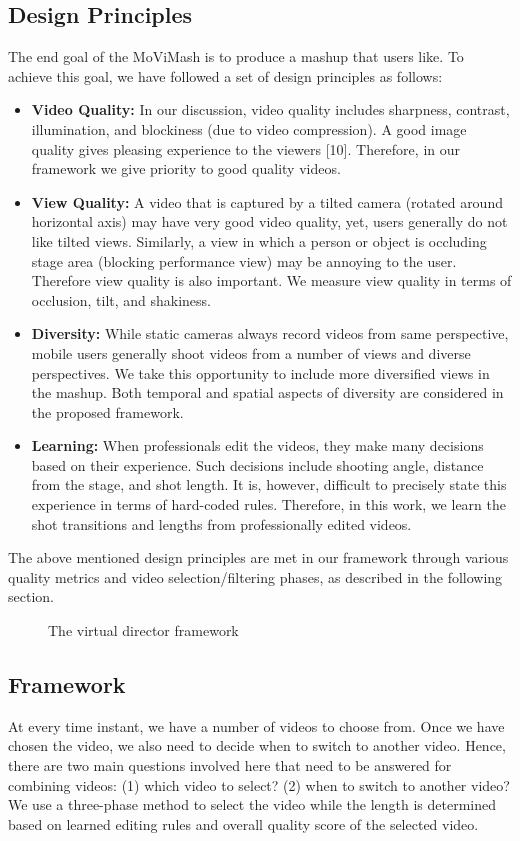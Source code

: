 \documentclass{sig-alternate}
\begin{document}
\subsection{Design Principles}
The end goal of the MoViMash is to produce a mashup that users
like. To achieve this goal, we have followed a set of design principles
as follows:
\begin{itemize}
\item  \textbf{Video Quality:} In our discussion, video quality includes
sharpness, contrast, illumination, and blockiness (due to video
compression). A good image quality gives pleasing experience
to the viewers [10]. Therefore, in our framework we
give priority to good quality videos.
\item \textbf{View Quality:} A video that is captured by a tilted camera
(rotated around horizontal axis) may have very good video
quality, yet, users generally do not like tilted views. Similarly,
a view in which a person or object is occluding stage
area (blocking performance view) may be annoying to the
user. Therefore view quality is also important. We measure
view quality in terms of occlusion, tilt, and shakiness.
\item \textbf{Diversity:} While static cameras always record videos from
same perspective, mobile users generally shoot videos from
a number of views and diverse perspectives. We take this
opportunity to include more diversified views in the mashup.
Both temporal and spatial aspects of diversity are considered
in the proposed framework.
\item \textbf{Learning:} When professionals edit the videos, they make
many decisions based on their experience. Such decisions
include shooting angle, distance from the stage, and shot
length. It is, however, difficult to precisely state this experience
in terms of hard-coded rules. Therefore, in this work,
we learn the shot transitions and lengths from professionally
edited videos.
\end{itemize}

The above mentioned design principles are met in our framework
through various quality metrics and video selection/filtering phases,
as described in the following section.

\begin{figure}
\centering
{}
\caption{The virtual director framework}
\end{figure}

\subsection{Framework}
At every time instant, we have a number of videos to choose
from. Once we have chosen the video, we also need to decide when
to switch to another video. Hence, there are two main questions
involved here that need to be answered for combining videos: (1)
which video to select? (2) when to switch to another video? We
use a three-phase method to select the video while the length is
determined based on learned editing rules and overall quality score
of the selected video.
\end{document}
